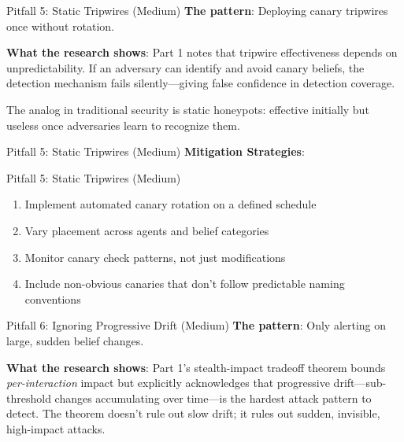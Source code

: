 \documentclass[
  ignorenonframetext,
]{beamer}
\providecommand{\tightlist}{%
  \setlength{\itemsep}{0pt}\setlength{\parskip}{0pt}}
\begin{document}
\begin{frame}[allowframebreaks]{Pitfall 5: Static Tripwires (Medium)}
\protect{}\label{pitfall-5-static-tripwires-medium}
\textbf{The pattern}: Deploying canary tripwires once without rotation.

\textbf{What the research shows}: Part 1 notes that tripwire
effectiveness depends on unpredictability. If an adversary can identify
and avoid canary beliefs, the detection mechanism fails
silently---giving false confidence in detection coverage.

The analog in traditional security is static honeypots: effective
initially but useless once adversaries learn to recognize them.

\end{frame}

\begin{frame}[allowframebreaks]{Pitfall 5: Static Tripwires (Medium)}
\textbf{Mitigation Strategies}:

\end{frame}

\begin{frame}[allowframebreaks]{Pitfall 5: Static Tripwires (Medium)}
\begin{enumerate}
\tightlist
\item
  Implement automated canary rotation on a defined schedule
\item
  Vary placement across agents and belief categories
\item
  Monitor canary check patterns, not just modifications
\item
  Include non-obvious canaries that don't follow predictable naming
  conventions
\end{enumerate}
\end{frame}

\begin{frame}[allowframebreaks]{Pitfall 6: Ignoring Progressive Drift
(Medium)}
\protect{}\label{pitfall-6-ignoring-progressive-drift-medium}
\textbf{The pattern}: Only alerting on large, sudden belief changes.

\textbf{What the research shows}: Part 1's stealth-impact tradeoff
theorem bounds \emph{per-interaction} impact but explicitly acknowledges
that progressive drift---sub-threshold changes accumulating over
time---is the hardest attack pattern to detect. The theorem doesn't rule
out slow drift; it rules out sudden, invisible, high-impact attacks.

\end{frame}
\end{document}
